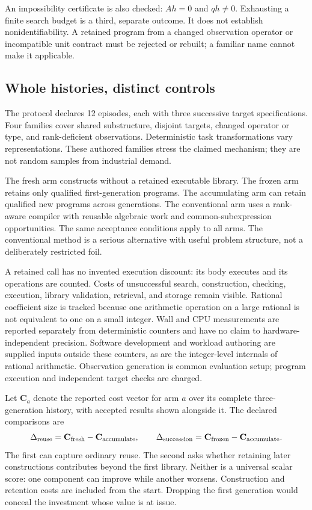 \documentclass[10pt,a4paper]{article}
\begin{document}
An impossibility certificate is also checked: $Ah=0$ and $qh\ne0$. Exhausting a finite search budget is a third, separate outcome. It does not establish nonidentifiability. A retained program from a changed observation operator or incompatible unit contract must be rejected or rebuilt; a familiar name cannot make it applicable.

\subsection{Whole histories, distinct controls}

The protocol declares 12 episodes, each with three successive target specifications. Four families cover shared substructure, disjoint targets, changed operator or type, and rank-deficient observations. Deterministic task transformations vary representations. These authored families stress the claimed mechanism; they are not random samples from industrial demand.

The fresh arm constructs without a retained executable library. The frozen arm retains only qualified first-generation programs. The accumulating arm can retain qualified new programs across generations. The conventional arm uses a rank-aware compiler with reusable algebraic work and common-subexpression opportunities. The same acceptance conditions apply to all arms. The conventional method is a serious alternative with useful problem structure, not a deliberately restricted foil.

A retained call has no invented execution discount: its body executes and its operations are counted. Costs of unsuccessful search, construction, checking, execution, library validation, retrieval, and storage remain visible. Rational coefficient size is tracked because one arithmetic operation on a large rational is not equivalent to one on a small integer. Wall and CPU measurements are reported separately from deterministic counters and have no claim to hardware-independent precision. Software development and workload authoring are supplied inputs outside these counters, as are the integer-level internals of rational arithmetic. Observation generation is common evaluation setup; program execution and independent target checks are charged.

Let $\mathbf C_a$ denote the reported cost vector for arm $a$ over its complete three-generation history, with accepted results shown alongside it. The declared comparisons are
\begin{equation}
\Delta_{\rm reuse}=\mathbf C_{\rm fresh}-\mathbf C_{\rm accumulate},
\qquad
\Delta_{\rm succession}=\mathbf C_{\rm frozen}-\mathbf C_{\rm accumulate}.
\label{eq:study}
\end{equation}
The first can capture ordinary reuse. The second asks whether retaining later constructions contributes beyond the first library. Neither is a universal scalar score: one component can improve while another worsens. Construction and retention costs are included from the start. Dropping the first generation would conceal the investment whose value is at issue.
\end{document}
